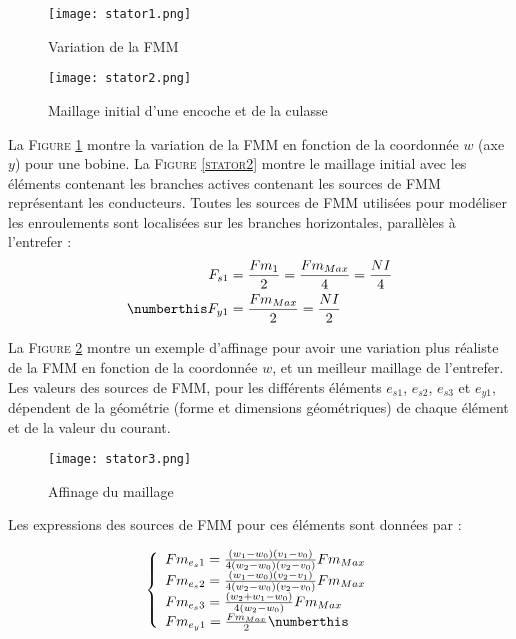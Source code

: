 \begin{figure}[H]
   \begin{minipage}[c]{.45\linewidth}
        \centering
              \texttt{[image: stator1.png]}
              \caption{Variation de la FMM}
            \label{stator2}
   \end{minipage} \hfill
   \begin{minipage}[c]{.45\linewidth}
      \centering
      \texttt{[image: stator2.png]}
      \caption{Maillage initial d’une encoche et de la culasse}
    \label{stator1}
   \end{minipage}
\end{figure}

La \textsc{Figure \ref{stator1}} montre la variation de la FMM en fonction de la coordonnée $w$ (axe $y$) pour une bobine. La \textsc{Figure \ref{stator2}} montre le maillage initial avec
les éléments contenant les branches actives contenant les sources de FMM représentant les
conducteurs. Toutes les sources de FMM utilisées pour modéliser les enroulements
sont localisées sur les branches horizontales, parallèles à l’entrefer :
\begin{align*}
    F_{s1} &= \frac{Fm_1}{2} = \frac{Fm_{Max}}{4}= \frac{NI}{4}\\ \numberthis
    F_{y1} &= \frac{Fm_{Max}}{2} = \frac{NI}{2} 
\end{align*}



La \textsc{Figure \ref{stator3}} montre un exemple d’affinage pour avoir une variation plus réaliste de la FMM en fonction de la coordonnée $w$, et un meilleur maillage de l’entrefer.
Les valeurs des sources de FMM, pour les différents éléments $e_{s1}$, $e_{s2}$, $e_{s3}$ et $e_{y1}$, dépendent de la géométrie (forme et dimensions géométriques) de chaque élément et de la valeur du
courant.

\begin{figure}[H]
    \centering
    \texttt{[image: stator3.png]}
    \caption{Affinage du maillage}
    \label{stator3}
\end{figure}

 Les expressions des sources de FMM pour ces éléments sont données par : 
 
 \[
\left\{
\begin{array}{l c l}
Fm_{e_s1}=\frac{(w_1-w_0)(v_1-v_0)}{4(w_2-w_0)(v_2-v_0)}Fm_{Max}\\
Fm_{e_s2}=\frac{(w_1-w_0)(v_2-v_1)}{4(w_2-w_0)(v_2-v_0)}Fm_{Max}\\
Fm_{e_s3}=\frac{(w_2+w_1-w_0)}{4(w_2-w_0)}Fm_{Max}\\
Fm_{e_y1} = \frac{Fm_{Max}}{2}\numberthis
\end{array}
\right.
\]


